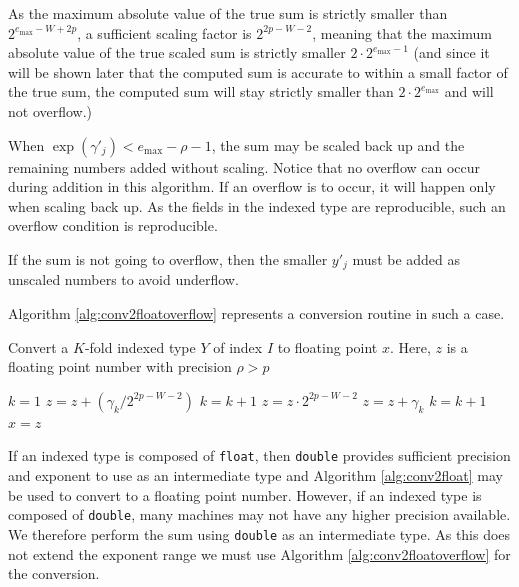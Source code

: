     As the maximum absolute value of the true sum is strictly smaller than $2^{e_{\max} - W + 2  p}$, a sufficient scaling factor is $2^{2  p - W - 2}$, meaning that the maximum absolute value of the true scaled sum is strictly smaller $2 \cdot 2^{e_{\max} - 1}$ (and since it will be shown later that the computed sum is accurate to within a small factor of the true sum, the computed sum will stay strictly smaller than $2 \cdot 2^{e_{\max}}$ and will not overflow.)

  When $\exp(\gamma'_j) < e_{\max} - \rho - 1$, the sum may be scaled back up and the remaining numbers added without scaling. Notice that no overflow can occur during addition in this algorithm. If an overflow is to occur, it will happen only when scaling back up. As the fields in the indexed type are reproducible, such an overflow condition is reproducible.

    If the sum is not going to overflow, then the smaller $y'_j$ must be added as unscaled numbers to avoid underflow.

    Algorithm \ref{alg:conv2floatoverflow} represents a conversion routine in such a case.

    \begin{samepage}
    \begin{alg}
      Convert a $K$-fold indexed type $Y$ of index $I$ to floating point $x$. Here, $z$ is a floating point number with precision $\rho > p$
      \begin{algorithmic}[1]
          \State $k = 1$
            \State $z = z + (\gamma_k / 2^{2 p - W - 2})$
            \State $k = k + 1$
          \EndWhile
          \State $z = z \cdot 2^{2 p - W - 2}$
            \State $z = z + \gamma_k$
            \State $k = k + 1$
          \EndWhile
          \State $x = z$
        \EndFunction
      \end{algorithmic}
      \label{alg:conv2floatoverflow}
    \end{alg}
    \end{samepage}

    If an indexed type is composed of \texttt{float}, then \texttt{double} provides sufficient precision and exponent to use as an intermediate type and Algorithm \ref{alg:conv2float} may be used to convert to a floating point number.
    However, if an indexed type is composed of \texttt{double}, many machines may not have any higher precision available. We therefore perform the sum using \texttt{double} as an intermediate type. As this does not extend the exponent range we must use Algorithm \ref{alg:conv2floatoverflow} for the conversion.

